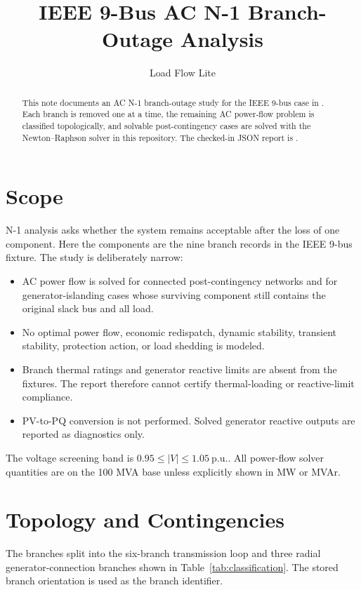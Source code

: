 \documentclass[11pt]{article}
\title{IEEE 9-Bus AC N-1 Branch-Outage Analysis}
\author{Load Flow Lite}
\date{}
\newcommand{\pu}{\mathrm{p.u.}}
\begin{document}
\maketitle

\begin{abstract}
This note documents an AC N-1 branch-outage study for the IEEE 9-bus case
in . Each branch is removed one at a time, the
remaining AC power-flow problem is classified topologically, and solvable
post-contingency cases are solved with the Newton--Raphson solver in this
repository. The checked-in JSON report is
.
\end{abstract}

\section{Scope}

N-1 analysis asks whether the system remains acceptable after the loss of
one component. Here the components are the nine branch records in the
IEEE 9-bus fixture. The study is deliberately narrow:

\begin{itemize}
  \item AC power flow is solved for connected post-contingency networks and
  for generator-islanding cases whose surviving component still contains
  the original slack bus and all load.
  \item No optimal power flow, economic redispatch, dynamic stability,
  transient stability, protection action, or load shedding is modeled.
  \item Branch thermal ratings and generator reactive limits are absent
  from the fixtures. The report therefore cannot certify thermal-loading
  or reactive-limit compliance.
  \item PV-to-PQ conversion is not performed. Solved generator reactive
  outputs are reported as diagnostics only.
\end{itemize}

The voltage screening band is $0.95 \le |V| \le 1.05~\pu$. All power-flow
solver quantities are on the 100 MVA base unless explicitly shown in MW or
MVAr.

\section{Topology and Contingencies}

The branches split into the six-branch transmission loop and three radial
generator-connection branches shown in Table~\ref{tab:classification}. The
stored branch orientation is used as the branch identifier.
\end{document}
